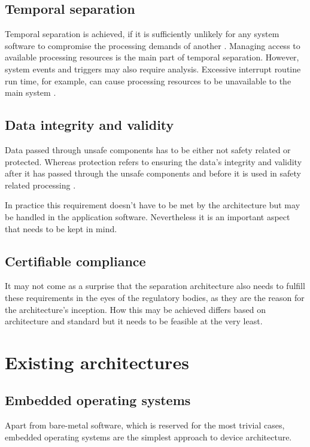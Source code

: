 \subsection{Temporal separation}
Temporal separation is achieved, if it is sufficiently unlikely for any system software to compromise the processing demands of another \cite{Wittenstein.temporal.2017}. 
Managing access to available processing resources is the main part of temporal separation. However, system events and triggers may also require analysis. Excessive interrupt routine run time, for example, can cause processing resources to be unavailable to the main system \cite{Wittenstein.temporal.2017}. 
\subsection{Data integrity and validity}
Data passed through unsafe components has to be either not safety related or protected. Whereas protection refers to ensuring the data's integrity and validity after it has passed through the unsafe components and before it is used in safety related processing \cite{Wittenstein.spatial.2017}.

In practice this requirement doesn't have to be met by the architecture but may be handled in the application software. Nevertheless it is an important aspect that needs to be kept in mind.
\subsection{Certifiable compliance}
It may not come as a surprise that the separation architecture also needs to fulfill these requirements in the eyes of the regulatory bodies, as they are the reason for the architecture's inception.
How this may be achieved differs based on architecture and standard but it needs to be feasible at the very least. 


\section{Existing architectures}
\subsection{Embedded operating systems}
Apart from bare-metal software, which is reserved for the most trivial cases,  embedded operating systems are the simplest approach to device architecture. 
